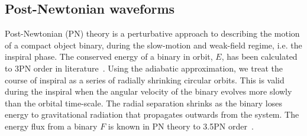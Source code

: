 \documentclass[aps,
prd,
twocolumn,
superscriptaddress,
lengthcheck,showpacs,letterpaper,nofootinbib,
floatfix]{revtex4-1}
\def\l({\left(}
\def\r){\right)}
\begin{document}
\subsection{Post-Newtonian waveforms}\label{s2:PNwaveforms}

Post-Newtonian (PN) theory is a perturbative approach to describing the
motion of a compact object binary, during the slow-motion and weak-field 
regime, i.e. the inspiral phase. The conserved energy of a binary in orbit,
$E$, has been calculated to 3PN order in literature~\citep{Jaranowski:1997ky,
Jaranowski:1999ye,Jaranowski:1999qd,Damour:2001bu,Blanchet:2003gy,
Damour:2000ni,Blanchet:2002mb}.
Using the adiabatic approximation, we treat the course of inspiral as a series
of radially shrinking circular orbits. This is valid during the inspiral when
the angular velocity of the binary evolves more slowly than the orbital 
time-scale. The radial separation shrinks as the binary loses energy to 
gravitational radiation that propagates outwards from the system. 
The energy flux from a binary $F$ is known in PN theory to 3.5PN 
order~\cite{FluxandE3-5PN,Blanchet:2004ek,Blanchet:2005tk,Blanchet:2004bb}.
\end{document}
